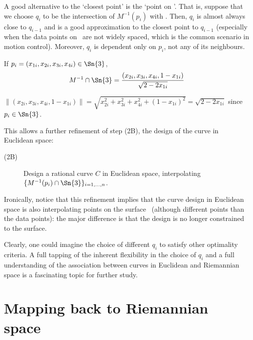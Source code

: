 
A good alternative to the `closest point' is the `point on '.
That is, suppose that we choose $q_i$ to be the intersection of
$M^{-1}(p_i)$ with .
Then, $q_i$ is almost always close to $q_{i-1}$
and is a good approximation to the closest point to $q_{i-1}$
(especially when the data points on \ are not widely spaced, which
is the common scenario in motion control).
Moreover, $q_i$ is dependent only on $p_i$, not any of its neighbours.

\begin{lemma}
If $p_i = (x_{1i}, x_{2i}, x_{3i}, x_{4i}) \in \Sn{3}$, 
\[
	M^{-1} \cap \Sn{3} 
	= \frac{(x_{2i}, x_{3i}, x_{4i}, 1 - x_{1i})}{\sqrt{2-2x_{1i}}}
\]
\end{lemma}
\prf
$\| (x_{2i}, x_{3i}, x_{4i}, 1 - x_{1i}) \|
 = \sqrt{x_{2i}^2 + x_{3i}^2 + x_{4i}^2 + (1 - x_{1i})^2}
 = \sqrt{2-2x_{1i}}$
since $p_i \in \Sn{3}$.
\QED

\noindent This allows a further refinement of step (2B), the design of the
curve in Euclidean space:
%
\begin{description}
\item[(2B)]
	Design a rational curve $C$ in Euclidean space,
	interpolating $\{M^{-1}(p_i) \cap \Sn{3}\}_{i=1,\ldots,n}$.
\end{description}

Ironically, notice that this refinement implies
that the curve design in Euclidean space is also interpolating points 
on the surface \ (although different points than the data points):
the major difference is that the design is no longer constrained
to the surface.

Clearly, one could imagine the choice of different $q_i$ to satisfy other
optimality criteria.
A full tapping of the inherent flexibility in the choice of $q_i$
and a full understanding of the association between curves in Euclidean
and Riemannian space is a fascinating topic for further study.

\section{Mapping back to Riemannian space}
\label{sec:curveimage}


